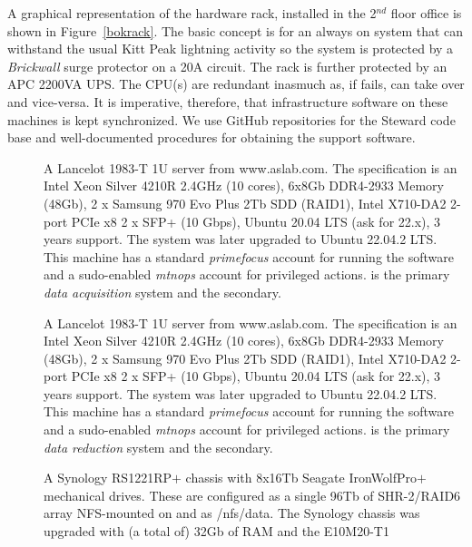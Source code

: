 \documentclass[12pt,twoside]{article}
\begin{document}
\noindent A graphical representation of the hardware rack, installed in the 2$^{nd}$ floor office is shown in Figure~\ref{bokrack}.
The basic concept is for an {\sc always on} system that can withstand the usual Kitt Peak lightning activity so the
system is protected by a \emph{Brickwall} surge protector on a 20A circuit. The rack is further protected by an APC 
2200VA UPS. The CPU(s) are redundant inasmuch as, if  fails,  can take over and vice-versa.
It is imperative, therefore, that infrastructure software on these machines is kept synchronized. We use GitHub repositories
for the Steward code base and well-documented procedures for obtaining the support software.

\begin{description}
\item[] A Lancelot 1983-T 1U server from www.aslab.com. The specification is an
              Intel Xeon Silver 4210R 2.4GHz (10 cores), 6x8Gb DDR4-2933 Memory (48Gb),
              2 x Samsung 970 Evo Plus 2Tb SDD (RAID1), Intel X710-DA2 2-port PCIe x8 2 x SFP+ (10 Gbps),
              Ubuntu 20.04 LTS (ask for 22.x), 3 years support. The system was later upgraded to Ubuntu 22.04.2 LTS.
              This machine has a standard \emph{primefocus} account for running the software and a sudo-enabled \emph{mtnops}
              account for privileged actions.
               is the primary \emph{data acquisition} system and  the secondary.
\item[] A Lancelot 1983-T 1U server from www.aslab.com. The specification is an
              Intel Xeon Silver 4210R 2.4GHz (10 cores), 6x8Gb DDR4-2933 Memory (48Gb),
              2 x Samsung 970 Evo Plus 2Tb SDD (RAID1), Intel X710-DA2 2-port PCIe x8 2 x SFP+ (10 Gbps),
              Ubuntu 20.04 LTS (ask for 22.x), 3 years support. The system was later upgraded to Ubuntu 22.04.2 LTS.
              This machine has a standard \emph{primefocus} account for running the software and a sudo-enabled \emph{mtnops}
              account for privileged actions.
               is the primary \emph{data reduction} system and  the secondary.
\item[] A Synology RS1221RP$+$ chassis with 8x16Tb Seagate IronWolfPro$+$ mechanical drives. These are
              configured as a single 96Tb of SHR-2/RAID6 array NFS-mounted on  and  as 
              /nfs/data. The Synology chassis was upgraded with (a total of) 32Gb of RAM and the E10M20-T1

\end{description}
\end{document}
